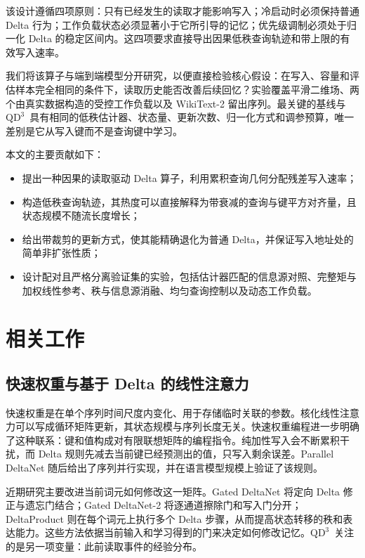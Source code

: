 \documentclass[11pt,a4paper]{ctexart}
\newcommand{\QDDD}{\ensuremath{\mathrm{QD}^{3}}}
\begin{document}
该设计遵循四项原则：只有已经发生的读取才能影响写入；冷启动时必须保持普通 Delta 行为；工作负载状态必须显著小于它所引导的记忆；优先级调制必须处于归一化 Delta 的稳定区间内。这四项要求直接导出因果低秩查询轨迹和带上限的有效写入速率。

我们将该算子与端到端模型分开研究，以便直接检验核心假设：在写入、容量和评估样本完全相同的条件下，读取历史能否改善后续回忆？实验覆盖平滑二维场、两个由真实数据构造的受控工作负载以及 WikiText-2 留出序列\cite{merity2016wikitext}。最关键的基线与 \QDDD\ 具有相同的低秩估计器、状态量、更新次数、归一化方式和调参预算，唯一差别是它从写入键而不是查询键中学习。

本文的主要贡献如下：
\begin{itemize}
  \item 提出一种因果的读取驱动 Delta 算子，利用累积查询几何分配残差写入速率；
  \item 构造低秩查询轨迹，其热度可以直接解释为带衰减的查询与键平方对齐量，且状态规模不随流长度增长；
  \item 给出带裁剪的更新方式，使其能精确退化为普通 Delta，并保证写入地址处的简单非扩张性质；
  \item 设计配对且严格分离验证集的实验，包括估计器匹配的信息源对照、完整矩与加权线性参考、秩与信息源消融、均匀查询控制以及动态工作负载。
\end{itemize}

\section{相关工作}\label{sec:related-zh}

\subsection{快速权重与基于 Delta 的线性注意力}

快速权重是在单个序列时间尺度内变化、用于存储临时关联的参数\cite{schmidhuber1992,ba2016}。核化线性注意力可以写成循环矩阵更新，其状态规模与序列长度无关\cite{katharopoulos2020}。快速权重编程进一步明确了这种联系：键和值构成对有限联想矩阵的编程指令\cite{schlag2021}。纯加性写入会不断累积干扰，而 Delta 规则先减去当前键已经预测出的值，只写入剩余误差。Parallel DeltaNet 随后给出了序列并行实现，并在语言模型规模上验证了该规则\cite{yang2024parallel}。

近期研究主要改进当前词元如何修改这一矩阵。Gated DeltaNet 将定向 Delta 修正与遗忘门结合\cite{yang2025gated}；Gated DeltaNet-2 将逐通道擦除门和写入门分开\cite{hatamizadeh2026gdn2}；DeltaProduct 则在每个词元上执行多个 Delta 步骤，从而提高状态转移的秩和表达能力\cite{siems2025deltaproduct}。这些方法依据当前输入和学习得到的门来决定如何修改记忆。\QDDD\ 关注的是另一项变量：此前读取事件的经验分布。
\end{document}
